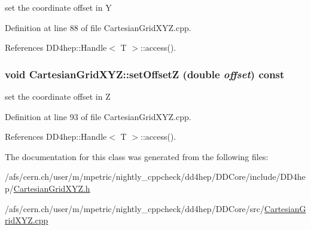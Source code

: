 set the coordinate offset in Y 

Definition at line 88 of file CartesianGridXYZ.cpp.

References DD4hep::Handle$<$ T $>$::access().\hypertarget{class_d_d4hep_1_1_geometry_1_1_cartesian_grid_x_y_z_ad7ac27ba83433c33b4b9831070d5961f}{
\subsubsection[{setOffsetZ}]{\setlength{\rightskip}{0pt plus 5cm}void CartesianGridXYZ::setOffsetZ (double {\em offset}) const}}
\label{class_d_d4hep_1_1_geometry_1_1_cartesian_grid_x_y_z_ad7ac27ba83433c33b4b9831070d5961f}


set the coordinate offset in Z 

Definition at line 93 of file CartesianGridXYZ.cpp.

References DD4hep::Handle$<$ T $>$::access().

The documentation for this class was generated from the following files:\begin{DoxyCompactItemize}
\item 
/afs/cern.ch/user/m/mpetric/nightly\_\-cppcheck/dd4hep/DDCore/include/DD4hep/\hyperlink{_d_d_core_2include_2_d_d4hep_2_cartesian_grid_x_y_z_8h}{CartesianGridXYZ.h}\item 
/afs/cern.ch/user/m/mpetric/nightly\_\-cppcheck/dd4hep/DDCore/src/\hyperlink{_d_d_core_2src_2_cartesian_grid_x_y_z_8cpp}{CartesianGridXYZ.cpp}\end{DoxyCompactItemize}
